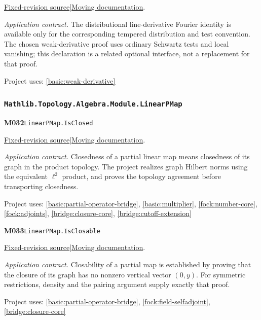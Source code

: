 \documentclass[11pt,a4paper]{article}
\theoremstyle{definition}
\theoremstyle{remark}
\begin{document}
\href{https://github.com/leanprover-community/mathlib4/blob/9bac2d0692944a775113f7c130fd5e5b4608a854/Mathlib/Analysis/Distribution/TemperedDistribution.lean}{Fixed-revision source}\quad|\quad\href{https://leanprover-community.github.io/mathlib4_docs/Mathlib/Analysis/Distribution/TemperedDistribution.html#TemperedDistribution.fourier_lineDerivOp_eq}{Moving documentation}.\par
\noindent\textit{Application contract.} The distributional line-derivative Fourier identity is available only for the corresponding tempered distribution and test convention. The chosen weak-derivative proof uses ordinary Schwartz tests and local vanishing; this declaration is a related optional interface, not a replacement for that proof.\par
{\small Project uses: \ref{basic:weak-derivative}}\par\medskip

\subsubsection*{\nolinkurl{Mathlib.Topology.Algebra.Module.LinearPMap}}
\noindent\textbf{M032}\label{base:M032}\quad\nolinkurl{LinearPMap.IsClosed}

\href{https://github.com/leanprover-community/mathlib4/blob/9bac2d0692944a775113f7c130fd5e5b4608a854/Mathlib/Topology/Algebra/Module/LinearPMap.lean}{Fixed-revision source}\quad|\quad\href{https://leanprover-community.github.io/mathlib4_docs/Mathlib/Topology/Algebra/Module/LinearPMap.html#LinearPMap.IsClosed}{Moving documentation}.\par
\noindent\textit{Application contract.} Closedness of a partial linear map means closedness of its graph in the product topology. The project realizes graph Hilbert norms using the equivalent $\ell^2$ product, and proves the topology agreement before transporting closedness.\par
{\small Project uses: \ref{basic:partial-operator-bridge}, \ref{basic:multiplier}, \ref{fock:number-core}, \ref{fock:adjoints}, \ref{bridge:closure-core}, \ref{bridge:cutoff-extension}}\par\medskip

\noindent\textbf{M033}\label{base:M033}\quad\nolinkurl{LinearPMap.IsClosable}

\href{https://github.com/leanprover-community/mathlib4/blob/9bac2d0692944a775113f7c130fd5e5b4608a854/Mathlib/Topology/Algebra/Module/LinearPMap.lean}{Fixed-revision source}\quad|\quad\href{https://leanprover-community.github.io/mathlib4_docs/Mathlib/Topology/Algebra/Module/LinearPMap.html#LinearPMap.IsClosable}{Moving documentation}.\par
\noindent\textit{Application contract.} Closability of a partial map is established by proving that the closure of its graph has no nonzero vertical vector $(0,y)$. For symmetric restrictions, density and the pairing argument supply exactly that proof.\par
{\small Project uses: \ref{basic:partial-operator-bridge}, \ref{fock:field-selfadjoint}, \ref{bridge:closure-core}}\par\medskip
\end{document}
